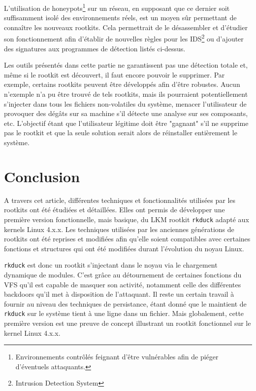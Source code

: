 \documentclass[12pt]{article}
\begin{document}
    L'utilisation de honeypots\footnote{Environnements contrôlés feignant d'être vulnérables afin de piéger d'éventuels attaquants.} sur un réseau, en supposant que ce dernier soit suffisamment isolé des environnements réels, est un moyen sûr permettant de connaître les nouveaux rootkits. Cela permettrait de le désassembler et d'étudier son fonctionnement afin d'établir de nouvelles règles pour les IDS\footnote{Intrusion Detection System} ou d'ajouter des signatures aux programmes de détection listés ci-dessus.
   
    Les outils présentés dans cette partie ne garantissent pas une détection totale et, même si le rootkit est découvert, il faut encore pouvoir le supprimer. Par exemple, certains rootkits peuvent être développés afin d'être robustes. Aucun n'exemple n'a pu être trouvé de tels rootkits, mais ils pourraient potentiellement s'injecter dans tous les fichiers non-volatiles du système, menacer l'utilisateur de provoquer des dégâts sur sa machine s'il détecte une analyse sur ses composants, etc. L'objectif étant que l'utilisateur légitime doit être "gagnant" s'il ne supprime pas le rootkit et que la seule solution serait alors de réinstaller entièrement le système.
    
\section*{Conclusion}
    
	A travers cet article, différentes techniques et fonctionnalités utilisées par les rootkits ont été étudiées et détaillées. Elles ont permis de développer une première version fonctionnelle, mais basique, du LKM rootkit \texttt{rkduck} adapté aux kernels Linux 4.x.x. Les techniques utilisées par les anciennes générations de rootkits ont été reprises et modifiées afin qu'elle soient compatibles avec certaines fonctions et structures qui ont été modifiées durant l'évolution du noyau Linux. 
	
	\texttt{rkduck} est donc un rootkit s'injectant dans le noyau via le chargement dynamique de modules. C'est grâce au détournement de certaines fonctions du VFS qu'il est capable de masquer son activité, notamment celle des différentes backdoors qu'il met à disposition de l'attaquant. Il reste un certain travail à fournir au niveau des techniques de persistance, étant donné que le maintient de \texttt{rkduck} sur le système tient à une ligne dans un fichier. Mais globalement, cette première version est une preuve de concept illustrant un rootkit fonctionnel sur le kernel Linux 4.x.x.
	
\end{document}
